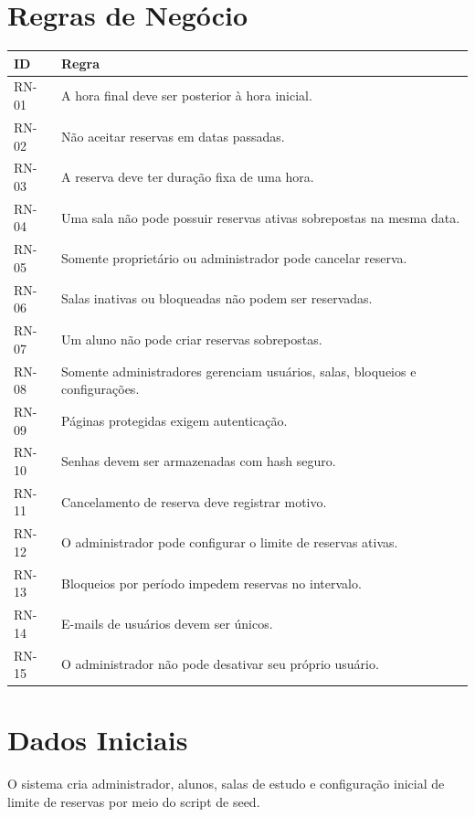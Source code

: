 \documentclass[12pt,a4paper]{article}
\begin{document}
\section{Regras de Negócio}
\begin{longtable}{|p{2cm}|p{12cm}|}
\hline
\textbf{ID} & \textbf{Regra} \\ \hline
RN-01 & A hora final deve ser posterior à hora inicial. \\ \hline
RN-02 & Não aceitar reservas em datas passadas. \\ \hline
RN-03 & A reserva deve ter duração fixa de uma hora. \\ \hline
RN-04 & Uma sala não pode possuir reservas ativas sobrepostas na mesma data. \\ \hline
RN-05 & Somente proprietário ou administrador pode cancelar reserva. \\ \hline
RN-06 & Salas inativas ou bloqueadas não podem ser reservadas. \\ \hline
RN-07 & Um aluno não pode criar reservas sobrepostas. \\ \hline
RN-08 & Somente administradores gerenciam usuários, salas, bloqueios e configurações. \\ \hline
RN-09 & Páginas protegidas exigem autenticação. \\ \hline
RN-10 & Senhas devem ser armazenadas com hash seguro. \\ \hline
RN-11 & Cancelamento de reserva deve registrar motivo. \\ \hline
RN-12 & O administrador pode configurar o limite de reservas ativas. \\ \hline
RN-13 & Bloqueios por período impedem reservas no intervalo. \\ \hline
RN-14 & E-mails de usuários devem ser únicos. \\ \hline
RN-15 & O administrador não pode desativar seu próprio usuário. \\ \hline
\end{longtable}

\section{Dados Iniciais}
O sistema cria administrador, alunos, salas de estudo e configuração inicial de limite de reservas por meio do script de seed.
\end{document}
